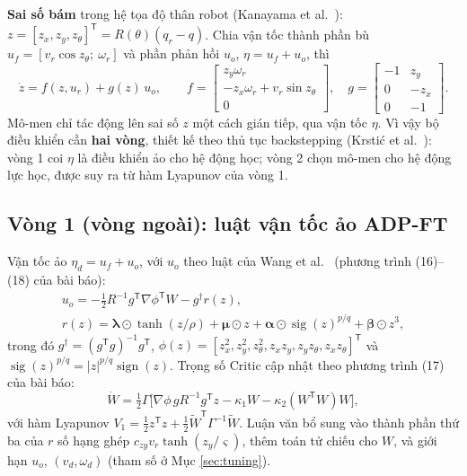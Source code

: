 \documentclass[12pt,a4paper]{article}
\newcommand{\T}{\mathsf{T}}
\begin{document}
\textbf{Sai số bám} trong hệ tọa độ thân robot (Kanayama et al.~\cite{Kanayama1990}): $z = [z_x, z_y, z_\theta]^\T = R(\theta)(q_r - q)$. Chia vận tốc thành phần bù $u_f = [v_r\cos z_\theta;\ \omega_r]$ và phần phản hồi $u_o$, $\eta = u_f + u_o$, thì
\begin{equation}
    \dot z = f(z, u_r) + g(z)\,u_o, \qquad
    f = \begin{bmatrix} z_y\omega_r \\ -z_x\omega_r + v_r\sin z_\theta \\ 0 \end{bmatrix}, \quad
    g = \begin{bmatrix} -1 & z_y \\ 0 & -z_x \\ 0 & -1 \end{bmatrix}.
\end{equation}
Mô-men chỉ tác động lên sai số $z$ một cách gián tiếp, qua vận tốc $\eta$. Vì vậy bộ điều khiển cần \textbf{hai vòng}, thiết kế theo thủ tục backstepping (Krstić et al.~\cite{Krstic1995}): vòng 1 coi $\eta$ là điều khiển ảo cho hệ động học; vòng 2 chọn mô-men cho hệ động lực học, được suy ra từ hàm Lyapunov của vòng 1.

\subsection{Vòng 1 (vòng ngoài): luật vận tốc ảo ADP-FT}

Vận tốc ảo $\eta_d = u_f + u_o$, với $u_o$ theo luật của Wang et al.~\cite{Wang2025} (phương trình (16)--(18) của bài báo):
\begin{gather}
    u_o = -\tfrac12 R^{-1} g^\T \nabla\phi^\T W - g^\dagger r(z), \\
    r(z) = \bm\lambda\odot\tanh(z/\rho) + \bm\mu\odot z + \bm\alpha\odot\operatorname{sig}(z)^{p/q} + \bm\beta\odot z^3,
\end{gather}
trong đó $g^\dagger = (g^\T g)^{-1}g^\T$, $\phi(z) = [z_x^2, z_y^2, z_\theta^2, z_xz_y, z_yz_\theta, z_xz_\theta]^\T$ và $\operatorname{sig}(z)^{p/q} = |z|^{p/q}\operatorname{sign}(z)$. Trọng số Critic cập nhật theo phương trình (17) của bài báo:
\begin{equation}
    \dot W = \tfrac12\Gamma\big[\nabla\phi\, g R^{-1} g^\T z - \kappa_1 W - \kappa_2 (W^\T W) W\big],
\end{equation}
với hàm Lyapunov $V_1 = \frac12 z^\T z + \frac12\tilde W^\T\Gamma^{-1}\tilde W$. Luận văn bổ sung vào thành phần thứ ba của $r$ số hạng ghép $c_{zy}v_r\tanh(z_y/\varsigma)$, thêm toán tử chiếu cho $W$, và giới hạn $u_o$, $(v_d, \omega_d)$ (tham số ở Mục \ref{sec:tuning}).
\end{document}
